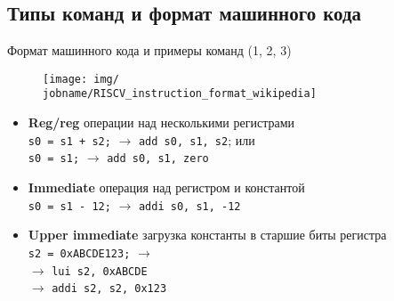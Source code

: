 \documentclass[xetex,aspectratio=43]{beamer}
\begin{document}
\subsection{Типы команд и формат машинного кода}

\begin{frame}[fragile]{Формат машинного кода и примеры команд (1, 2, 3)}
    \begin{figure}
        \texttt{[image: img/\\jobname/RISCV\_instruction\_format\_wikipedia]}
    \end{figure}

    \begin{itemize}
        \tightlist
        \item \textbf{Reg/reg} операции над несколькими регистрами \\
        \texttt{s0 = s1 + s2;} $\rightarrow$ \texttt{add s0, s1, s2}; или\\
        \texttt{s0 = s1;} $\rightarrow$ \texttt{add s0, s1, zero}
        \item \textbf{Immediate} операция над регистром и константой \\
        \texttt{s0 = s1 - 12;} $\rightarrow$ \texttt{addi s0, s1, -12}
        \item \textbf{Upper immediate} загрузка константы в старшие биты регистра\\
        \texttt{s2 = 0xABCDE123;} $\rightarrow$ \\
        $\rightarrow$ \texttt{lui s2, 0xABCDE} \\
        {\color{white} $\rightarrow$} \texttt{addi s2, s2, 0x123}
    \end{itemize}
\end{frame}
\end{document}
